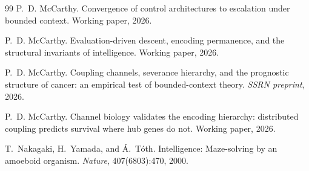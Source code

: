 \documentclass[11pt]{article}
\theoremstyle{definition}
\begin{document}
\begin{thebibliography}{99}
P.~D. McCarthy.
\newblock Convergence of control architectures to escalation under bounded
  context.
\newblock Working paper, 2026.

P.~D. McCarthy.
\newblock Evaluation-driven descent, encoding permanence, and the structural
  invariants of intelligence.
\newblock Working paper, 2026.

P.~D. McCarthy.
\newblock Coupling channels, severance hierarchy, and the prognostic
structure of cancer: an empirical test of bounded-context theory.
\newblock \emph{SSRN preprint}, 2026.

P.~D. McCarthy.
\newblock Channel biology validates the encoding hierarchy: distributed
  coupling predicts survival where hub genes do not.
\newblock Working paper, 2026.

T.~Nakagaki, H.~Yamada, and {\'A}.~T{\'o}th.
\newblock Intelligence: Maze-solving by an amoeboid organism.
\newblock \emph{Nature}, 407(6803):470, 2000.

\end{thebibliography}
\end{document}

